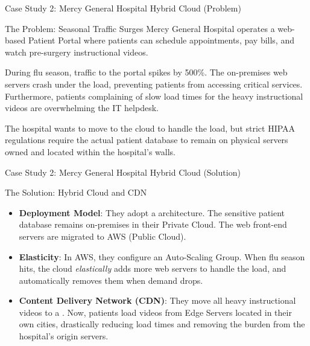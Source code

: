 \documentclass[aspectratio=169]{beamer}  %
\begin{document}
\begin{frame}[t]{Case Study 2: Mercy General Hospital Hybrid Cloud (Problem)}
    \begin{casestudy}{The Problem: Seasonal Traffic Surges}
        \footnotesize
        Mercy General Hospital operates a web-based Patient Portal where patients can schedule appointments, pay bills, and watch pre-surgery instructional videos. 
        
        During flu season, traffic to the portal spikes by 500\%. The on-premises web servers crash under the load, preventing patients from accessing critical services. Furthermore, patients complaining of slow load times for the heavy instructional videos are overwhelming the IT helpdesk. 
        
        The hospital wants to move to the cloud to handle the load, but strict HIPAA regulations require the actual patient database to remain on physical servers owned and located within the hospital's walls.
    \end{casestudy}
\end{frame}

\begin{frame}[t]{Case Study 2: Mercy General Hospital Hybrid Cloud (Solution)}
    \begin{casesolution}{The Solution: Hybrid Cloud and CDN}
        \footnotesize
        \begin{itemize}
            \item \textbf{Deployment Model}: They adopt a  architecture. The sensitive patient database remains on-premises in their Private Cloud. The web front-end servers are migrated to AWS (Public Cloud).
            \item \textbf{Elasticity}: In AWS, they configure an Auto-Scaling Group. When flu season hits, the cloud \textit{elastically} adds more web servers to handle the load, and automatically removes them when demand drops.
            \item \textbf{Content Delivery Network (CDN)}: They move all heavy instructional videos to a . Now, patients load videos from Edge Servers located in their own cities, drastically reducing load times and removing the burden from the hospital's origin servers.
        \end{itemize}
    \end{casesolution}
\end{frame}

\end{document}
